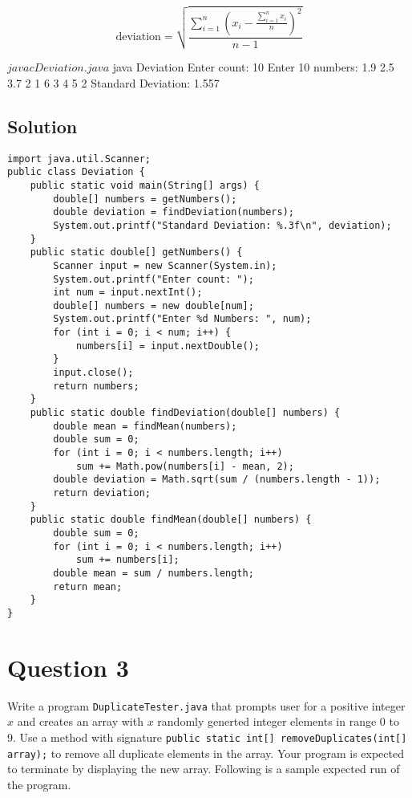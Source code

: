 \begin{equation}
\text{deviation} = \sqrt{\frac{\sum_{i = 1}^{n} \left( x_i - \frac{\sum_{i = 1}^{n} x_i}{n} \right)^2 }{n - 1}}
\label{eq1}
\end{equation}

\begin{terminal}
$ javac Deviation.java
$ java Deviation
Enter count: 10
Enter 10 numbers: 1.9 2.5 3.7 2 1 6 3 4 5 2
Standard Deviation: 1.557
\end{terminal}

\newpage

\subsection*{Solution}

\lstset{language=Java,tabsize=4}
\begin{lstlisting}
import java.util.Scanner;
public class Deviation {
	public static void main(String[] args) {
		double[] numbers = getNumbers();
		double deviation = findDeviation(numbers);
		System.out.printf("Standard Deviation: %.3f\n", deviation);
	}
	public static double[] getNumbers() {
		Scanner input = new Scanner(System.in);
		System.out.printf("Enter count: ");
		int num = input.nextInt();
		double[] numbers = new double[num];
		System.out.printf("Enter %d Numbers: ", num);
		for (int i = 0; i < num; i++) {
			numbers[i] = input.nextDouble();
		}
		input.close();
		return numbers;
	}
	public static double findDeviation(double[] numbers) {
		double mean = findMean(numbers);
		double sum = 0;
		for (int i = 0; i < numbers.length; i++)
			sum += Math.pow(numbers[i] - mean, 2);
		double deviation = Math.sqrt(sum / (numbers.length - 1));
		return deviation;
	}
	public static double findMean(double[] numbers) {
		double sum = 0;
		for (int i = 0; i < numbers.length; i++)
			sum += numbers[i];
		double mean = sum / numbers.length;
		return mean;
	}
}
\end{lstlisting}

\newpage

\section*{Question 3}
Write a program \texttt{DuplicateTester.java} that prompts user for a positive integer $x$ and creates an array with $x$ randomly generted integer elements in range 0 to 9.
Use a method with signature \texttt{public static int[] removeDuplicates(int[] array);} to remove all duplicate elements in the array.
Your program is expected to terminate by displaying the new array.
Following is a sample expected run of the program.

